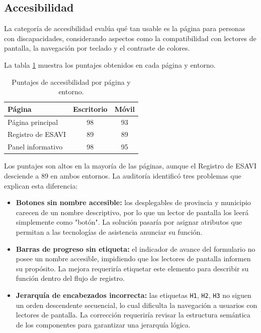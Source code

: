 \subsection{Accesibilidad}

La categoría de accesibilidad evalúa qué tan usable es la página para personas con discapacidades, considerando aspectos como la compatibilidad con lectores de pantalla, la navegación por teclado y el contraste de colores.

La tabla \ref{tab:accesibilidad} muestra los puntajes obtenidos en cada página y entorno.

\begin{table}[H]
\centering
\caption{Puntajes de accesibilidad por página y entorno.}
\label{tab:accesibilidad}
\begin{tabular}{lcc}
\hline
\textbf{Página} & \textbf{Escritorio} & \textbf{Móvil} \\
\hline
Página principal       & 98 & 93 \\
Registro de ESAVI      & 89 & 89 \\
Panel informativo      & 98 & 95 \\
\hline
\end{tabular}
\end{table}

Los puntajes son altos en la mayoría de las páginas, aunque el Registro de ESAVI desciende a 89 en ambos entornos. La auditoría identificó tres problemas que explican esta diferencia:

\begin{itemize}
    \item \textbf{Botones sin nombre accesible:} los desplegables de provincia y municipio carecen de un nombre descriptivo, por lo que un lector de pantalla los leerá simplemente como "botón". La solución pasaría por asignar atributos que permitan a las tecnologías de asistencia anunciar su función.
     
    \item \textbf{Barras de progreso sin etiqueta:} el indicador de avance del formulario no posee un nombre accesible, impidiendo que los lectores de pantalla informen su propósito. La mejora requeriría etiquetar este elemento para describir su función dentro del flujo de registro.
    
    \item \textbf{Jerarquía de encabezados incorrecta:} las etiquetas \texttt{H1}, \texttt{H2}, \texttt{H3} no siguen un orden descendente secuencial, lo cual dificulta la navegación a usuarios con lectores de pantalla. La corrección requeriría revisar la estructura semántica de los componentes para garantizar una jerarquía lógica.
\end{itemize}

